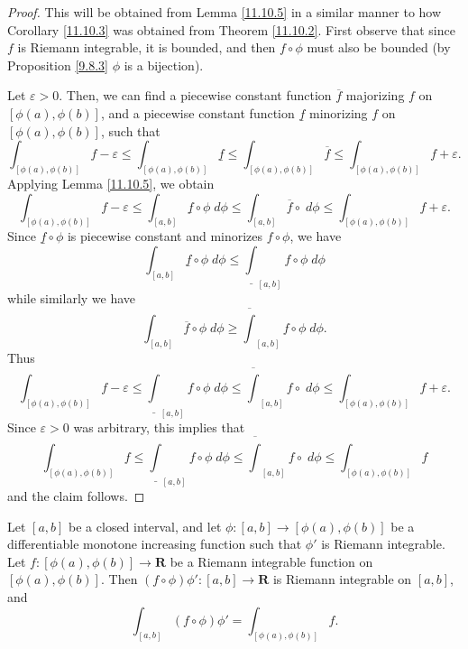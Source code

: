 \begin{proof}
    This will be obtained from Lemma \ref{11.10.5} in a similar manner to how Corollary \ref{11.10.3} was obtained from Theorem \ref{11.10.2}.
    First observe that since \(f\) is Riemann integrable, it is bounded, and then \(f \circ \phi\) must also be bounded (by Proposition \ref{9.8.3} \(\phi\) is a bijection).

    Let \(\varepsilon > 0\).
    Then, we can find a piecewise constant function \(\overline{f}\) majorizing \(f\) on \([\phi(a), \phi(b)]\), and a piecewise constant function \(\underline{f}\) minorizing \(f\) on \([\phi(a), \phi(b)]\), such that
    \[
        \int_{[\phi(a), \phi(b)]} f - \varepsilon \leq \int_{[\phi(a), \phi(b)]} \underline{f} \leq \int_{[\phi(a), \phi(b)]} \overline{f} \leq \int_{[\phi(a), \phi(b)]} f + \varepsilon.
    \]
    Applying Lemma \ref{11.10.5}, we obtain
    \[
        \int_{[\phi(a), \phi(b)]} f - \varepsilon \leq \int_{[a, b]} \underline{f} \circ \phi \; d \phi \leq \int_{[a, b]} \overline{f} \circ \; d \phi \leq \int_{[\phi(a), \phi(b)]} f + \varepsilon.
    \]
    Since \(\underline{f} \circ \phi\) is piecewise constant and minorizes \(f \circ \phi\), we have
    \[
        \int_{[a, b]} \underline{f} \circ \phi \; d \phi \leq \underline{\int}_{[a, b]} f \circ \phi \; d \phi
    \]
    while similarly we have
    \[
        \int_{[a, b]} \overline{f} \circ \phi \; d \phi \geq \overline{\int}_{[a, b]} f \circ \phi \; d \phi.
    \]
    Thus
    \[
        \int_{[\phi(a), \phi(b)]} f - \varepsilon \leq \underline{\int}_{[a, b]} f \circ \phi \; d \phi \leq \overline{\int}_{[a, b]} f \circ \; d \phi \leq \int_{[\phi(a), \phi(b)]} f + \varepsilon.
    \]
    Since \(\varepsilon > 0\) was arbitrary, this implies that
    \[
        \int_{[\phi(a), \phi(b)]} f \leq \underline{\int}_{[a, b]} f \circ \phi \; d \phi \leq \overline{\int}_{[a, b]} f \circ \; d \phi \leq \int_{[\phi(a), \phi(b)]} f
    \]
    and the claim follows.
\end{proof}

\begin{proposition}\label{11.10.7}
    Let \([a, b]\) be a closed interval, and let \(\phi : [a, b] \to [\phi(a), \phi(b)]\) be a differentiable monotone increasing function such that \(\phi'\) is Riemann integrable.
    Let \(f : [\phi(a), \phi(b)] \to \mathbf{R}\) be a Riemann integrable function on \([\phi(a), \phi(b)]\).
    Then \((f \circ \phi) \phi' : [a, b] \to \mathbf{R}\) is Riemann integrable on \([a, b]\), and
    \[
        \int_{[a, b]} (f \circ \phi) \phi' = \int_{[\phi(a), \phi(b)]} f.
    \]
\end{proposition}


